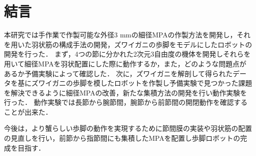 \newpage
\section{結言}
本研究では手作業で作製可能な外径3 mmの細径MPAの作製方法を開発し，それを用いた羽状筋の構成手法の開発，ズワイガニの歩脚をモデルにしたロボットの開発を行った．
まず，4つの節に分かれた2次元3自由度の機体を開発しそれらを用いて細径MPAを羽状配置にした際に動作するか，また，どのような問題点があるか予備実験によって確認した．
次に，ズワイガニを解剖して得られたデータを基にズワイガニの歩脚を模したロボットを作製し予備実験で見つかった課題を解決できるように細径MPAの改善，新たな集積方法の開発を行い動作実験を行った．
動作実験では長節から腕節間，腕節から前節間の開閉動作を確認することが出来た．

今後は，より蟹らしい歩脚の動作を実現するために節間膜の実装や羽状筋の配置の見直しを行い，前節から指節間にも集積したMPAを配置し歩脚ロボットの完成を目指す．